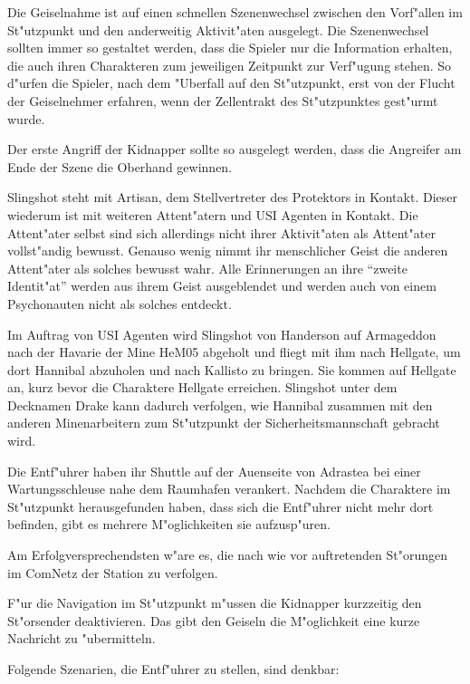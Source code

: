 \begin{remarks}
	Die Geiselnahme ist auf einen schnellen Szenenwechsel zwischen den Vorf"allen im St"utzpunkt und den anderweitig Aktivit"aten ausgelegt. Die Szenenwechsel sollten immer so gestaltet werden, dass die Spieler nur die Information erhalten, die auch ihren Charakteren zum jeweiligen Zeitpunkt zur Verf"ugung stehen. So d"urfen die Spieler, nach dem "Uberfall auf den St"utzpunkt, erst von der Flucht der Geiselnehmer erfahren, wenn der Zellentrakt des St"utzpunktes gest"urmt wurde.
	
	Der erste Angriff der Kidnapper sollte so ausgelegt werden, dass die Angreifer am Ende der Szene die Oberhand gewinnen.

	Slingshot steht mit Artisan, dem Stellvertreter des Protektors in Kontakt. Dieser wiederum ist mit weiteren Attent"atern und USI Agenten in Kontakt. Die Attent"ater selbst sind sich allerdings nicht ihrer Aktivit"aten als Attent"ater vollst"andig bewusst. Genauso wenig nimmt ihr menschlicher Geist die anderen Attent"ater als solches bewusst wahr. Alle Erinnerungen an ihre "`zweite Identit"at"' werden aus ihrem Geist ausgeblendet und werden auch von einem Psychonauten nicht als solches entdeckt.
	
	Im Auftrag von USI Agenten wird Slingshot von Handerson auf Armageddon nach der Havarie der Mine HeM05 abgeholt und fliegt mit ihm nach Hellgate, um dort Hannibal abzuholen und nach Kallisto zu bringen. Sie kommen auf Hellgate an, kurz bevor die Charaktere Hellgate erreichen. Slingshot unter dem Decknamen Drake kann dadurch verfolgen, wie Hannibal zusammen mit den anderen Minenarbeitern zum St"utzpunkt der Sicherheitsmannschaft gebracht wird.
\end{remarks}



Die Entf"uhrer haben ihr Shuttle auf der Au\3enseite von Adrastea bei einer Wartungsschleuse nahe dem Raumhafen verankert. Nachdem die Charaktere im St"utzpunkt herausgefunden haben, dass sich die Entf"uhrer nicht mehr dort befinden, gibt es mehrere M"oglichkeiten sie aufzusp"uren. 

Am Erfolgversprechendsten w"are es, die nach wie vor auftretenden St"orungen im ComNetz der Station zu verfolgen. 

F"ur die Navigation im St"utzpunkt m"ussen die Kidnapper kurzzeitig den St"orsender deaktivieren. Das gibt den Geiseln die M"oglichkeit eine kurze Nachricht zu "ubermitteln.

Folgende Szenarien, die Entf"uhrer zu stellen, sind denkbar:

